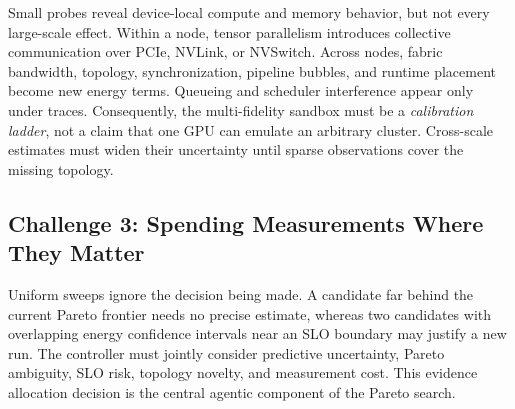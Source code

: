 Small probes reveal device-local compute and memory behavior, but not every
large-scale effect.  Within a node, tensor parallelism introduces collective
communication over PCIe, NVLink, or NVSwitch.  Across nodes, fabric bandwidth,
topology, synchronization, pipeline bubbles, and runtime placement become new
energy terms.  Queueing and scheduler interference appear only under traces.
Consequently, the multi-fidelity sandbox must be a \emph{calibration ladder},
not a claim that one GPU can emulate an arbitrary cluster.  Cross-scale
estimates must widen their uncertainty until sparse observations cover the
missing topology.

\subsection{Challenge 3: Spending Measurements Where They Matter}

Uniform sweeps ignore the decision being made.  A candidate far behind the
current Pareto frontier needs no precise estimate, whereas two candidates with
overlapping energy confidence intervals near an SLO boundary may justify a
new run.  The controller must jointly consider predictive uncertainty, Pareto
ambiguity, SLO risk, topology novelty, and measurement cost.  This evidence
allocation decision is the central agentic component of the Pareto search.
